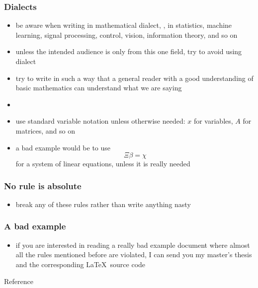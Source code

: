\documentclass[usepdftitle=false]{beamer}
\begin{document}
\begin{frame}
    \frametitle{Dialects}

    \begin{itemize}\itemsep=12pt
        \item be aware when writing in mathematical dialect, \eg, in statistics, machine learning, signal processing, control, vision, information theory, and so on
        \item unless the intended audience is only from this one field, try to avoid using dialect
        \item try to write in such a way that a general reader with a good understanding of basic mathematics can understand what we are saying
        \item[] 
        \item use standard variable notation unless otherwise needed: $x$ for variables, $A$ for matrices, and so on
        \item a bad example would be to use
            \[
                \Xi \beta = \chi
            \]
            for a system of linear equations, unless it is really needed
    \end{itemize}
\end{frame}

\begin{frame}
    \frametitle{No rule is absolute}

    \begin{itemize}
        \item break any of these rules rather than write anything nasty
    \end{itemize}

\end{frame}

\begin{frame}
    \frametitle{A bad example}

    \begin{itemize}
        \item if you are interested in reading a really bad example document where almost all the rules mentioned before are violated, I can send you my master's thesis and the corresponding \LaTeX\ source code
    \end{itemize}

\end{frame}

\begin{frame}{Reference}
    \small
    
\end{frame}
\end{document}
